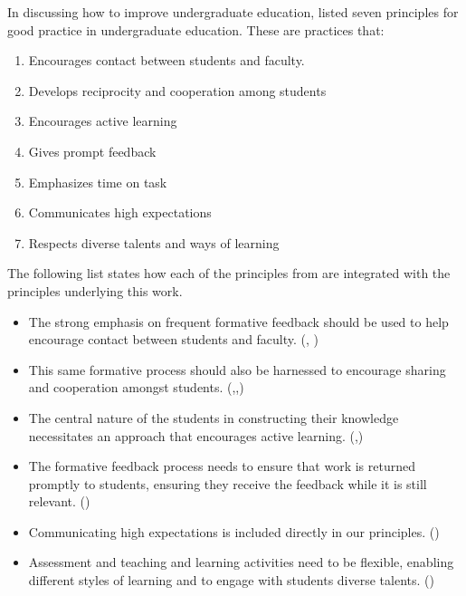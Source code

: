 In discussing how to improve undergraduate education, \citet{Chickering:1987} listed seven principles for good practice in undergraduate education. These are practices that:
\begin{enumerate}
	\item Encourages contact between students and faculty.
	\item Develops reciprocity and cooperation among students
	\item Encourages active learning
	\item Gives prompt feedback
	\item Emphasizes time on task
	\item Communicates high expectations
	\item Respects diverse talents and ways of learning
\end{enumerate}

The following list states how each of the principles from \citet{Chickering:1987} are integrated with the principles underlying this work. 
\begin{itemize}[noitemsep,nolistsep]
	\item The strong emphasis on frequent formative feedback should be used to help encourage contact between students and faculty. (, )
	\item This same formative process should also be harnessed to encourage sharing and cooperation amongst students. (,,)
	\item The central nature of the students in constructing their knowledge necessitates an approach that encourages active learning. (,)
	\item The formative feedback process needs to ensure that work is returned promptly to students, ensuring they receive the feedback while it is still relevant. ()
	\item Communicating high expectations is included directly in our principles. ()
	\item Assessment and teaching and learning activities need to be flexible, enabling different styles of learning and to engage with students diverse talents. ()
\end{itemize}



